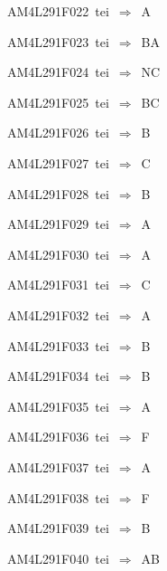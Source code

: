 {\sixrm AM4L291F022\ {\sixit tei}\ }$\Rightarrow$\ A\par\smallskip
{\sixrm AM4L291F023\ {\sixit tei}\ }$\Rightarrow$\ BA\par\smallskip
{\sixrm AM4L291F024\ {\sixit tei}\ }$\Rightarrow$\ NC\par\smallskip
{\sixrm AM4L291F025\ {\sixit tei}\ }$\Rightarrow$\ BC\par\smallskip
{\sixrm AM4L291F026\ {\sixit tei}\ }$\Rightarrow$\ B\par\smallskip
{\sixrm AM4L291F027\ {\sixit tei}\ }$\Rightarrow$\ C\par\smallskip
{\sixrm AM4L291F028\ {\sixit tei}\ }$\Rightarrow$\ B\par\smallskip
{\sixrm AM4L291F029\ {\sixit tei}\ }$\Rightarrow$\ A\par\smallskip
{\sixrm AM4L291F030\ {\sixit tei}\ }$\Rightarrow$\ A\par\smallskip
{\sixrm AM4L291F031\ {\sixit tei}\ }$\Rightarrow$\ C\par\smallskip
{\sixrm AM4L291F032\ {\sixit tei}\ }$\Rightarrow$\ {\tenit A}\par\smallskip
{\sixrm AM4L291F033\ {\sixit tei}\ }$\Rightarrow$\ {\tenit B}\par\smallskip
{\sixrm AM4L291F034\ {\sixit tei}\ }$\Rightarrow$\ B\par\smallskip
{\sixrm AM4L291F035\ {\sixit tei}\ }$\Rightarrow$\ A\par\smallskip
{\sixrm AM4L291F036\ {\sixit tei}\ }$\Rightarrow$\ {\tenit F}\par\smallskip
{\sixrm AM4L291F037\ {\sixit tei}\ }$\Rightarrow$\ {\tenit A}\par\smallskip
{\sixrm AM4L291F038\ {\sixit tei}\ }$\Rightarrow$\ {\tenit F}\par\smallskip
{\sixrm AM4L291F039\ {\sixit tei}\ }$\Rightarrow$\ {\tenit B}\par\smallskip
{\sixrm AM4L291F040\ {\sixit tei}\ }$\Rightarrow$\ AB\par\smallskip

